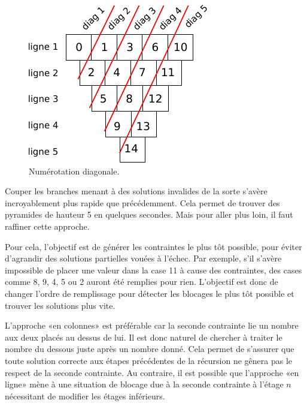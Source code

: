 \documentclass[10pt]{article}\usepackage[correction,nu]{esial}
\begin{document}
\begin{figure}
  \vspace{-1.6\baselineskip}
  \centerline{\includegraphics[scale=.9]{img/numerotation-diagonales.pdf}}
  \vspace{-.5\baselineskip}
  \caption{Numérotation diagonale.}
  \label{fig:numdiag}
   \vspace{-1.5\baselineskip}
\end{figure}

Couper les branches menant à des solutions invalides de la sorte s'avère
incroyablement plus rapide que précédemment. Cela permet de trouver des
pyramides de hauteur 5 en quelques secondes. Mais pour aller plus loin, il faut
raffiner cette approche.

Pour cela, l'objectif est de générer les contraintes le plus tôt possible, pour
éviter d'agrandir des solutions partielles vouées à l'échec. Par exemple, s'il
s'avère impossible de placer une valeur dans la case 11 à cause des contraintes,
des cases comme 8, 9, 4, 5 ou 2 auront été remplies pour rien. L'objectif est
donc de changer l'ordre de remplissage pour détecter les blocages le plus tôt
possible et trouver les solutions plus vite.

L'approche «en colonnes» est préférable car la seconde contrainte lie un nombre
aux deux placés au dessus de lui. Il est donc naturel de chercher à traiter le
nombre du dessous juste après un nombre donné. Cela permet de s'assurer que
toute solution correcte aux étapes précédentes de la récursion ne gênera pas le
respect de la seconde contrainte. Au contraire, il est possible que l'approche
«en ligne» mène à une situation de blocage due à la seconde contrainte à l'étage
$n$ nécessitant de modifier les étages inférieurs.
\end{document}
